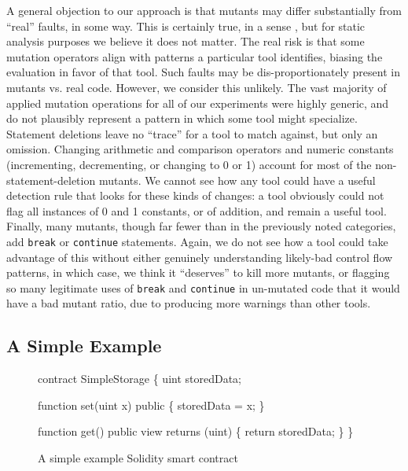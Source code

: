 A general objection to our approach is that mutants may differ substantially from ``real'' faults, in some way.  This is certainly true, in a sense \cite{GopinathMutants}, but for static analysis purposes we believe it does not matter.   The real risk is that some mutation operators align with patterns a particular tool identifies, biasing the evaluation in favor of that tool.  Such faults may be dis-proportionately present in mutants vs. real code.  However, we consider this unlikely.  The vast majority of applied mutation operations for all of our experiments were highly generic, and do not plausibly represent a pattern in which some tool might specialize.  Statement deletions leave no ``trace'' for a tool to match against, but only an omission.  Changing arithmetic and comparison operators and numeric constants (incrementing, decrementing, or changing to 0 or 1) account for most of the non-statement-deletion mutants.  We cannot see how any tool could have a useful detection rule that looks for these kinds of changes: a tool obviously could not flag all instances of 0 and 1 constants, or of addition, and remain a useful tool.  Finally, many mutants, though far fewer than in the previously noted categories, add {\tt break} or {\tt continue} statements.  Again, we do not see how a tool could take advantage of this without either genuinely understanding likely-bad control flow patterns, in which case, we think it ``deserves'' to kill more mutants, or flagging so many legitimate uses of {\tt break} and {\tt continue} in un-mutated code that it would have a bad mutant ratio, due to producing more warnings than other tools. 

\subsection{A Simple Example}

\begin{figure}
{\scriptsize
\begin{code}
contract SimpleStorage \{
    uint storedData;

    function set(uint x) public \{
        storedData = x;
    \}

    function get() public view returns (uint) \{
        return storedData;
    \}
  \}
\end{code}
}
\caption{A simple example Solidity smart contract}
\label{fig:sol424intro}
\end{figure}

